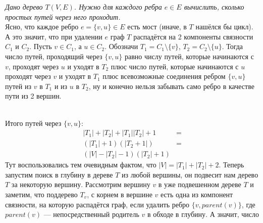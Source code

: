 \task{}
\textit{Дано дерево $T(V,E)$. Нужно для каждого ребра $e\in E$ вычислить, сколько простых путей через него проходит.}\\
Ясно, что каждое ребро $e=\lbrace v,u \rbrace \in E$ есть мост (иначе, в $T$ нашёлся бы цикл). А это значит, что при удалении $e$ 
граф $T$ распадётся на 2 компоненты связности $C_1$ и $C_2$. Пусть $v\in C_1$, а $u \in C_2$. Обозначи $T_1=C_1\setminus \lbrace v \rbrace$, $T_2=C_2\setminus \lbrace u \rbrace$. Тогда число путей, проходящий через $\lbrace v, u \rbrace$ равно числу путей, 
которые начинаются с $v$, проходят через $u$ и уходят в $T_2$ плюс число путей,
которые начинаются с $u$ проходят через $v$ и уходят в $T_1$ плюс всевозможные соединения ребром $\lbrace v,u \rbrace$ путей из 
$v$ в $T_1$ и из $u$ в $T_2$, ну и конечно нельзя забывать само ребро в качестве пути из 2 вершин.
\begin{figure}[ht!]
\centering
\end{figure}\\
Итого путей через $\lbrace v,u \rbrace$:
\begin{equation*}
\begin{split}
|T_1|+|T_2|+|T_1||T_2|+1 &=\\
(|T_1|+1)(|T_2+1|) &=\\
(|V|-|T_2|-1)(|T_2| + 1)
\end{split}
\end{equation*}
Тут воспользовались тем очевидным фактом, что $|V|=|T_1|+|T_2|+2$. Теперь запустим поиск в глубину в дереве $T$ из любой
вершины, он подвесит нам дерево $T$ за некоторую вершину. Рассмотрим вершину $v$ в уже подвешенном дереве $T$ и заметим,
что поддерево $T_v$, с корнем в вершине $v$ есть одна из компонент связности, на которую распадётся граф, если удалить ребро
$\lbrace v, parent(v) \rbrace$, где $parent(v)$ --- непосредственный родитель $v$ в обходе в глубину. А значит, число
